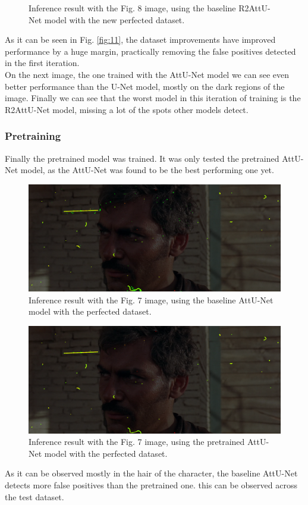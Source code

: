 \documentclass[openany, 12pt]{article}
\begin{document}
{\begin{figure}[h!]
	\caption{\smaller Inference result with the Fig. 8 image, using the baseline R2AttU-Net model with the new perfected dataset.} 
\end{figure}
As it can be seen in Fig. \ref{fig:11}, the dataset improvements have improved performance by a huge margin, practically removing the false positives detected in the first iteration. \\
On the next image, the one trained with the AttU-Net model we can see even better performance than the U-Net model, mostly on the dark regions of the image. Finally we can see that the worst model in this iteration of training is the R2AttU-Net model, missing a lot of the spots other models detect. 
\newpage
\subsubsection*{Pretraining}
Finally the pretrained model was trained. It was only tested the pretrained AttU-Net model, as the AttU-Net was found to be the best performing one yet. 
\begin{figure}[h!]
	\centering
	\includegraphics[width=0.7\linewidth]{images/punado_dollars_frame_0084-mask_pretrained_unet_40_epoch_oldloader_v1.png_comparaison.png}
	\caption{\smaller Inference result with the Fig. 7 image, using the baseline AttU-Net model with the perfected dataset.} 
	\label{fig:14}
\end{figure}
\begin{figure}[h!]
	\centering
	\includegraphics[width=0.7\linewidth]{images/punado_dollars_frame_0084-mask_big_dataset_unet_50_v1.png_comparaison.png}
	\caption{\smaller Inference result with the Fig. 7 image, using the pretrained AttU-Net model with the perfected dataset.} 
\end{figure}
As it can be observed mostly in the hair of the character, the baseline AttU-Net detects more false positives than the pretrained one. this can be observed across the test dataset. 
}
\end{document}
